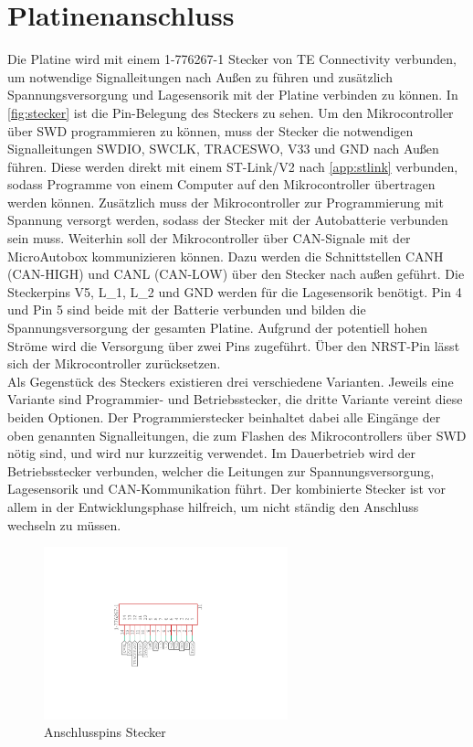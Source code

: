 \section{Platinenanschluss}\label{sec:stecker}
Die Platine wird mit einem 1-776267-1 Stecker von TE Connectivity verbunden, um notwendige Signalleitungen nach Außen zu führen und zusätzlich Spannungsversorgung und Lagesensorik mit der Platine verbinden zu können. In \autoref{fig:stecker} ist die Pin-Belegung des Steckers zu sehen. Um den Mikrocontroller über SWD programmieren zu können, muss der Stecker die notwendigen Signalleitungen SWDIO, SWCLK, TRACESWO, V33 und GND nach Außen führen. Diese werden direkt mit einem ST-Link/V2 nach \autoref{app:stlink} verbunden, sodass Programme von einem Computer auf den Mikrocontroller übertragen werden können. Zusätzlich muss der Mikrocontroller zur Programmierung mit Spannung versorgt werden, sodass der Stecker mit der Autobatterie verbunden sein muss. Weiterhin soll der Mikrocontroller über CAN-Signale mit der MicroAutobox kommunizieren können. Dazu werden die Schnittstellen CANH (CAN-HIGH) und CANL (CAN-LOW) über den Stecker nach außen geführt. Die Steckerpins V5, L\_1, L\_2 und GND werden für die Lagesensorik benötigt. Pin 4 und Pin 5 sind beide mit der Batterie verbunden und bilden die Spannungsversorgung der gesamten Platine. Aufgrund der potentiell hohen Ströme wird die Versorgung über zwei Pins zugeführt. Über den NRST-Pin lässt sich der Mikrocontroller zurücksetzen.\\ Als Gegenstück des Steckers existieren drei verschiedene Varianten. Jeweils eine Variante sind Programmier- und Betriebsstecker, die dritte Variante vereint diese beiden Optionen. Der Programmierstecker beinhaltet dabei alle Eingänge der oben genannten Signalleitungen, die zum Flashen des Mikrocontrollers über SWD nötig sind, und wird nur kurzzeitig verwendet. Im Dauerbetrieb wird der Betriebsstecker verbunden, welcher die Leitungen zur Spannungsversorgung, Lagesensorik und CAN-Kommunikation führt. Der kombinierte Stecker ist vor allem in der Entwicklungsphase hilfreich, um nicht ständig den Anschluss wechseln zu müssen. 


\begin{figure}[H]%
\centering
\includegraphics[width=200pt]{./Bilder/stecker.pdf}%
\caption{Anschlusspins Stecker}%
\label{fig:stecker}%
\end{figure}

